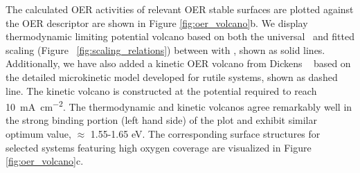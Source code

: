 

%
The calculated OER activities of relevant OER stable surfaces are 
plotted against the \DGOmOH OER descriptor are shown in Figure \ref{fig:oer_volcano}b.
We display thermodynamic limiting potential volcano based on both the universal~\cite{Man2011} and fitted scaling (Figure ~\ref{fig:scaling_relations}) between \DGOOH with \DGOH, shown as solid lines. Additionally, we have also added a kinetic OER volcano from Dickens ~\cite{Dickens2019} based on the detailed microkinetic model developed for rutile systems, shown as dashed line. The kinetic volcano is constructed at the potential required to reach \SI[mode=text]{10}{\mA\per\cm\squared}. The thermodynamic and kinetic volcanos agree remarkably well in the strong binding portion (left hand side) of the plot and exhibit similar optimum value, \DGOmOH $\approx$ 1.55-1.65 eV. The corresponding surface structures for selected systems featuring high oxygen coverage are visualized in Figure \ref{fig:oer_volcano}c.

